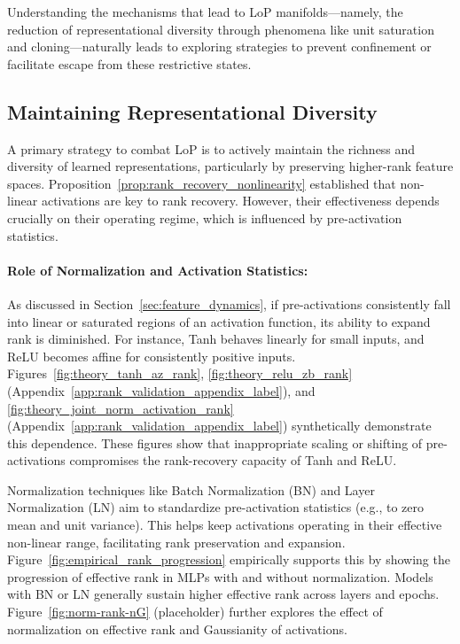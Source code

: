 \documentclass{article}
\begin{document}
Understanding the mechanisms that lead to LoP manifolds—namely, the reduction of representational diversity through phenomena like unit saturation and cloning—naturally leads to exploring strategies to prevent confinement or facilitate escape from these restrictive states.

\subsection{Maintaining Representational Diversity}
A primary strategy to combat LoP is to actively maintain the richness and diversity of learned representations, particularly by preserving higher-rank feature spaces. Proposition~\ref{prop:rank_recovery_nonlinearity} established that non-linear activations are key to rank recovery. However, their effectiveness depends crucially on their operating regime, which is influenced by pre-activation statistics.

\paragraph{Role of Normalization and Activation Statistics:}
As discussed in Section~\ref{sec:feature_dynamics}, if pre-activations consistently fall into linear or saturated regions of an activation function, its ability to expand rank is diminished. For instance, Tanh behaves linearly for small inputs, and ReLU becomes affine for consistently positive inputs. Figures~\ref{fig:theory_tanh_az_rank}, \ref{fig:theory_relu_zb_rank} (Appendix~\ref{app:rank_validation_appendix_label}), and \ref{fig:theory_joint_norm_activation_rank} (Appendix~\ref{app:rank_validation_appendix_label}) synthetically demonstrate this dependence. These figures show that inappropriate scaling or shifting of pre-activations compromises the rank-recovery capacity of Tanh and ReLU.

Normalization techniques like Batch Normalization (BN) \citep{ioffe2015batch} and Layer Normalization (LN) aim to standardize pre-activation statistics (e.g., to zero mean and unit variance). This helps keep activations operating in their effective non-linear range, facilitating rank preservation and expansion. Figure~\ref{fig:empirical_rank_progression} empirically supports this by showing the progression of effective rank in MLPs with and without normalization. Models with BN or LN generally sustain higher effective rank across layers and epochs.
Figure~\ref{fig:norm-rank-nG} (placeholder) further explores the effect of normalization on effective rank and Gaussianity of activations.
\end{document}
